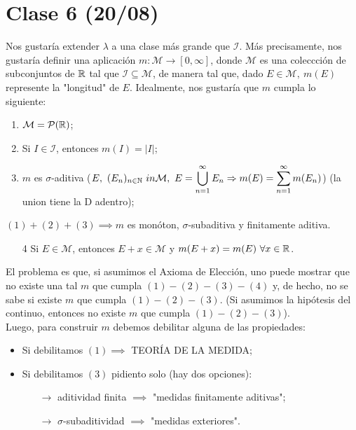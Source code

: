 \documentclass[a4paper]{report}
\begin{document}
	\section{Clase 6 (20/08)}

	Nos gustaría extender $\lambda$ a una clase más grande que $\mathcal{I}$. Más precisamente, nos gustaría definir una aplicación $m : \mathcal{M} \to [0,\infty]$, donde $\mathcal{M}$ es una coleccción de subconjuntos de $\mathbb{R}$ tal que $\mathcal{I} \subseteq \mathcal{M}$, de manera tal que, dado $E \in \mathcal{M},\ m(E)$ represente la "longitud" de $E$. Idealmente, nos gustaría que $m$ cumpla lo siguiente:

	\begin{enumerate}
		\item $\mathcal{M} = \mathcal{P}(\mathbb{R})$;

		\item Si $I \in \mathcal{I}$, entonces $m(I) = |I|$;

		\item $m$ es $\sigma$-aditiva ($E,\ (E_n)_{n\in\mathbb{N}}\ in \mathcal{M},\ E = \displaystyle\bigcup_{n=1}^{\infty} E_n \Rightarrow m(E) = \sum_{n=1}^{\infty} m(E_n)$) (la union tiene la D adentro);
	\end{enumerate}

	\begin{ex}
		$(1)+(2)+(3) \implies m$ es monóton, $\sigma$-subaditiva y finitamente aditiva. 
	\end{ex}

	\begin{enumerate}
		\item[4] Si $E \in \mathcal{M}$, entonces $E + x \in \mathcal{M}$ y $m(E + x) = m(E)\ \forall x \in \mathbb{R}$.
	\end{enumerate}

	\noindent El problema es que, si asumimos el Axioma de Elección, uno puede mostrar que no existe una tal $m$ que cumpla $(1)-(2)-(3)-(4)$ y, de hecho, no se sabe si existe $m$ que cumpla $(1)-(2)-(3)$. (Si asumimos la hipótesis del continuo, entonces no existe $m$ que cumpla $(1)-(2)-(3)$). \\

	\noindent Luego, para construir $m$ debemos debilitar alguna de las propiedades:
	\begin{itemize}
		\item Si debilitamos $(1) \implies$ TEORÍA DE LA MEDIDA;
		
		\item Si debilitamos $(3)$ pidiento solo (hay dos opciones):

		\begin{itemize}
			\item[$\rightarrow$] aditividad finita $ \implies$ "medidas finitamente aditivas";
		
			\item[$\rightarrow$] $\sigma$-subaditividad $\implies$ "medidas exteriores".
		\end{itemize}
	\end{itemize}
\end{document}
